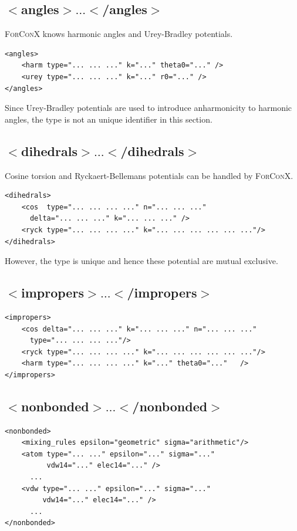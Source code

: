 \documentclass[12pt]{article}
\begin{document}
\subsection{$<$angles$> \ldots <$/angles$>$}
\textsc{ForConX} knows harmonic angles and Urey-Bradley potentials.
\begin{lstlisting}[basicstyle=\linespread{1.1}\ttfamily\small]
<angles>
    <harm type="... ... ..." k="..." theta0="..." />
    <urey type="... ... ..." k="..." r0="..." />
</angles>
\end{lstlisting}
Since Urey-Bradley potentials are used to introduce anharmonicity to harmonic angles,
the type is not an unique identifier in this section.

\subsection{$<$dihedrals$> \ldots <$/dihedrals$>$}
Cosine torsion and Ryckaert-Bellemans potentials can be handled by \textsc{ForConX}.
\begin{lstlisting}[basicstyle=\linespread{1.1}\ttfamily\small]
<dihedrals>
    <cos  type="... ... ... ..." n="... ... ..."
	  delta="... ... ..." k="... ... ..." />
    <ryck type="... ... ... ..." k="... ... ... ... ... ..."/>
</dihedrals>
\end{lstlisting}
However, the type is unique and hence these potential are mutual exclusive.

\subsection{$<$impropers$> \ldots <$/impropers$>$}


\begin{lstlisting}[basicstyle=\linespread{1.1}\ttfamily\small]
<impropers>
    <cos delta="... ... ..." k="... ... ..." n="... ... ..." 
	  type="... ... ... ..."/>
    <ryck type="... ... ... ..." k="... ... ... ... ... ..."/>
    <harm type="... ... ... ..." k="..." theta0="..."	/>  
</impropers>
\end{lstlisting}


\subsection{$<$nonbonded$> \ldots <$/nonbonded$>$}

\begin{lstlisting}[basicstyle=\linespread{1.1}\ttfamily\small]
<nonbonded>
    <mixing_rules epsilon="geometric" sigma="arithmetic"/>
    <atom type="... ..." epsilon="..." sigma="..."  
          vdw14="..." elec14="..." />
      ...
    <vdw type="... ..." epsilon="..." sigma="..."  
         vdw14="..." elec14="..." />
      ...
</nonbonded>
\end{lstlisting}
\end{document}
